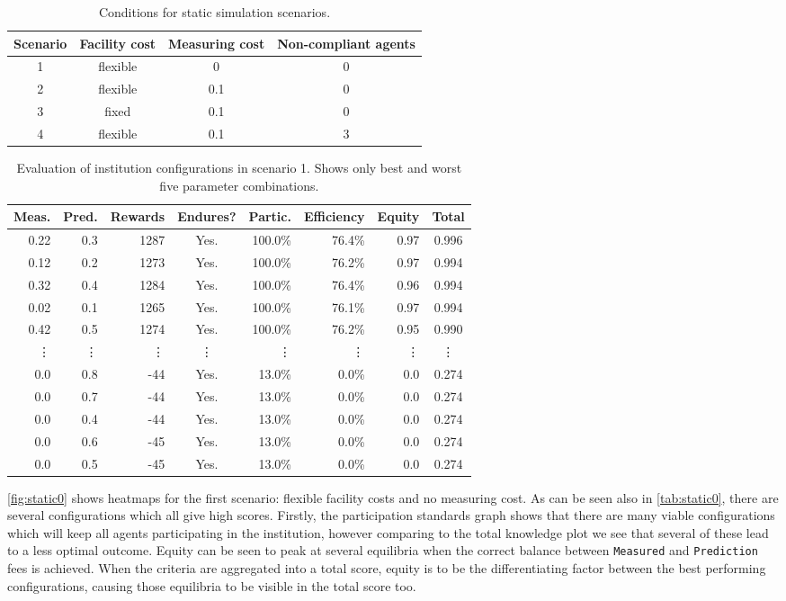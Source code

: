 \begin{table}
\centering
\caption{Conditions for static simulation scenarios.}\label{tab:scenarios}
\begin{tabular}{c||c|c|c}
Scenario & Facility cost & Measuring cost & Non-compliant agents \\
\hline
1 & flexible & 0 & 0 \\
2 & flexible & 0.1 & 0 \\
3 & fixed & 0.1 & 0 \\
4 & flexible & 0.1 & 3 \\
\end{tabular}
\end{table}

\begin{table}
\centering
\caption{Evaluation of institution configurations in scenario 1. Shows only best and worst five parameter combinations.}\label{tab:static0}
\begin{tabular}{rr|rcrrr|c}
Meas. & Pred. & Rewards & Endures? & Partic. & Efficiency & Equity & Total \\
\hline
0.22 & 0.3 & 1287 & Yes. & 100.0\% & 76.4\% & 0.97 & 0.996 \\
0.12 & 0.2 & 1273 & Yes. & 100.0\% & 76.2\% & 0.97 & 0.994 \\
0.32 & 0.4 & 1284 & Yes. & 100.0\% & 76.4\% & 0.96 & 0.994 \\
0.02 & 0.1 & 1265 & Yes. & 100.0\% & 76.1\% & 0.97 & 0.994 \\
0.42 & 0.5 & 1274 & Yes. & 100.0\% & 76.2\% & 0.95 & 0.990 \\
\vdots & \vdots & \vdots & \vdots & \vdots & \vdots & \vdots & \vdots \\
0.0 & 0.8 & -44 & Yes. & 13.0\% & 0.0\% & 0.0 & 0.274 \\
0.0 & 0.7 & -44 & Yes. & 13.0\% & 0.0\% & 0.0 & 0.274 \\
0.0 & 0.4 & -44 & Yes. & 13.0\% & 0.0\% & 0.0 & 0.274 \\
0.0 & 0.6 & -45 & Yes. & 13.0\% & 0.0\% & 0.0 & 0.274 \\
0.0 & 0.5 & -45 & Yes. & 13.0\% & 0.0\% & 0.0 & 0.274 \\
\end{tabular}
\end{table}

\autoref{fig:static0} shows heatmaps for the first scenario: flexible
facility costs and no measuring cost. As can be seen also in
\autoref{tab:static0}, there are several configurations which all give high
scores. Firstly, the participation standards graph shows that there are many
viable configurations which will keep all agents participating in the
institution, however comparing to the total knowledge plot we see that several of
these lead to a less optimal outcome. Equity can be seen to peak at several
equilibria when the correct balance between \texttt{Measured} and
\texttt{Prediction} fees is achieved. When the criteria are aggregated into a
total score, equity is to be the differentiating factor between the best
performing configurations, causing those equilibria to be visible in the total
score too.

